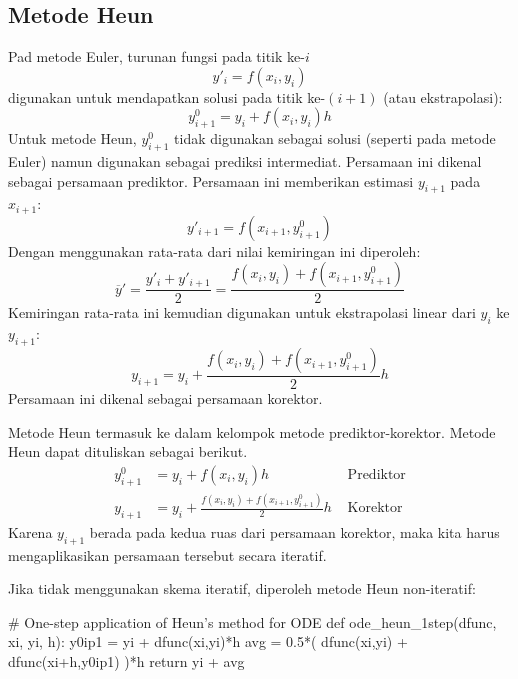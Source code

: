 \subsection{Metode Heun}

Pad metode Euler, turunan fungsi pada titik ke-$i$ 
\begin{equation*}
y'_{i} = f(x_i, y_i)
\end{equation*}
digunakan untuk mendapatkan solusi pada titik ke-$(i+1)$ (atau ekstrapolasi):
\begin{equation*}
y^{0}_{i+1} = y_{i} + f(x_i, y_i) h
\end{equation*}
Untuk metode Heun, $y^{0}_{i+1}$ tidak digunakan sebagai solusi (seperti pada metode Euler)
namun digunakan sebagai prediksi intermediat.
Persamaan ini dikenal sebagai persamaan prediktor.
Persamaan ini memberikan estimasi $y_{i+1}$ pada $x_{i+1}$:
\begin{equation*}
y'_{i+1} = f(x_{i+1}, y^{0}_{i+1})
\end{equation*}
Dengan menggunakan rata-rata dari nilai kemiringan ini diperoleh:
\begin{equation*}
\overline{y}' = \frac{y'_{i} + y'_{i+1}}{2} = 
\frac{f(x_i, y_i) + f(x_{i+1},y^{0}_{i+1})}{2}
\end{equation*}
Kemiringan rata-rata ini kemudian digunakan untuk ekstrapolasi linear dari $y_{i}$ ke
$y_{i+1}$:
\begin{equation*}
y_{i+1} = y_{i} + \frac{f(x_i, y_i) + f(x_{i+1}, y^{0}_{i+1})}{2} h
\end{equation*}
Persamaan ini dikenal sebagai persamaan korektor.

Metode Heun termasuk ke dalam kelompok metode prediktor-korektor. Metode Heun dapat
dituliskan sebagai berikut.
\begin{align}
y^{0}_{i+1} & = y_{i} + f(x_i, y_i) h & \text{   Prediktor}\\
y_{i+1} & = y_{i} + \frac{f(x_i, y_i) + f(x_{i+1}, y^{0}_{i+1})}{2} h & \text{   Korektor}
\end{align}
Karena $y_{i+1}$ berada pada kedua ruas dari persamaan korektor, maka kita harus mengaplikasikan
persamaan tersebut secara iteratif.

Jika tidak menggunakan skema iteratif, diperoleh metode Heun non-iteratif:
\begin{pythoncode}
# One-step application of Heun's method for ODE
def ode_heun_1step(dfunc, xi, yi, h):
    y0ip1 = yi + dfunc(xi,yi)*h
    avg = 0.5*( dfunc(xi,yi) + dfunc(xi+h,y0ip1) )*h
    return yi + avg
\end{pythoncode}


